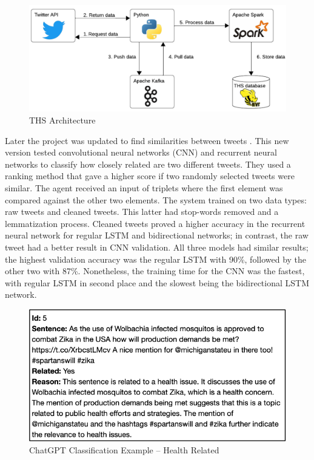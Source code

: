  \begin{figure}[!h]
    \centering
        \includegraphics[width=1\linewidth]{images/ths_architecture.png}
        \caption{THS Architecture}
        \label{ths_architecture}
\end{figure}

 
Later the project was updated to find similarities between tweets \cite{9581175}. This new version tested convolutional neural networks (CNN) and recurrent neural networks to classify how closely related are two different tweets.
They used a ranking method that gave a higher score if two randomly selected tweets were similar. The agent received an input of triplets where the first element was compared against the other two elements.
The system trained on two data types: raw tweets and cleaned tweets. This latter had stop-words removed and a lemmatization process. Cleaned tweets proved a higher accuracy in the recurrent neural network
for regular LSTM and bidirectional networks; in contrast, the raw tweet had a better result in CNN validation. All three models had similar results; the highest validation accuracy was the regular LSTM with 90\%,
followed by the other two with 87\%. Nonetheless, the training time for the CNN was the fastest, with regular LSTM in second place and the slowest being the bidirectional LSTM network. 


  \begin{figure}[!h]
    \centering
        \includegraphics[width=0.8\linewidth]{images/base_gpt_health.png}
        \caption{ChatGPT Classification Example – Health Related}
        \label{gpt_health}
\end{figure}


